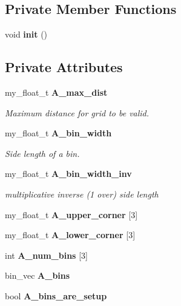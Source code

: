 \subsection*{Private Member Functions}
\begin{CompactItemize}
\item 
void \textbf{init} ()\label{classSimSite3D_1_1geometry_1_1DistanceArray_2750d605e1e1559a1af94773627ebf7e}

\end{CompactItemize}
\subsection*{Private Attributes}
\begin{CompactItemize}
\item 
my\_\-float\_\-t \bf{A\_\-max\_\-dist}\label{classSimSite3D_1_1geometry_1_1DistanceArray_8d48a1538dbd9906eb57f4ee7b366c66}

\begin{CompactList}\small\item\em Maximum distance for grid to be valid. \item\end{CompactList}\item 
my\_\-float\_\-t \bf{A\_\-bin\_\-width}\label{classSimSite3D_1_1geometry_1_1DistanceArray_3db71eff2a24debe8bbcfae462759b76}

\begin{CompactList}\small\item\em Side length of a bin. \item\end{CompactList}\item 
my\_\-float\_\-t \bf{A\_\-bin\_\-width\_\-inv}\label{classSimSite3D_1_1geometry_1_1DistanceArray_87ff0d438ee6643277aa4264f450cd0c}

\begin{CompactList}\small\item\em multiplicative inverse (1 over) side length \item\end{CompactList}\item 
my\_\-float\_\-t \textbf{A\_\-upper\_\-corner} [3]\label{classSimSite3D_1_1geometry_1_1DistanceArray_01a14247bcabaecf8e917b8aa5acf65a}

\item 
my\_\-float\_\-t \textbf{A\_\-lower\_\-corner} [3]\label{classSimSite3D_1_1geometry_1_1DistanceArray_8e955d0b3ebfb53e2ca6c19ee8983a29}

\item 
int \textbf{A\_\-num\_\-bins} [3]\label{classSimSite3D_1_1geometry_1_1DistanceArray_fbbb787940946323d4451b72fcedbfcf}

\item 
bin\_\-vec \textbf{A\_\-bins}\label{classSimSite3D_1_1geometry_1_1DistanceArray_d1d1803122cc7bfd7cce80e64afe297e}

\item 
bool \textbf{A\_\-bins\_\-are\_\-setup}\label{classSimSite3D_1_1geometry_1_1DistanceArray_2d5a5de8383858eddee83da5ad46887e}

\end{CompactItemize}


